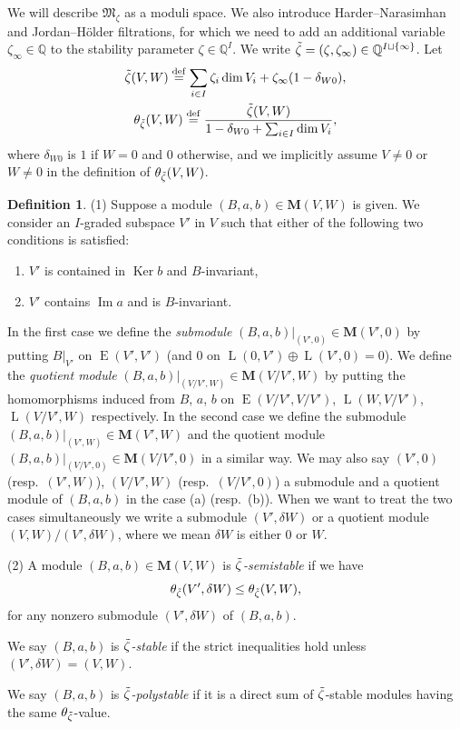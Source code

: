 \documentclass[11pt]{article}
\newenvironment{aenume}{%
  \begin{enumerate}%
  \renewcommand{\theenumi}{\alph{enumi}}%
  \renewcommand{\labelenumi}{\textup{(\theenumi)}}%
  }{\end{enumerate}}
\theoremstyle{definition}
\newtheorem{Definition}[equation]{Definition}
\numberwithin{equation}{section}
\newcommand{\defeq}{\overset{\operatorname{\scriptstyle def}}{=}}
\newcommand{\Q}{{\mathbb Q}}
\newcommand{\Ker}{\operatorname{Ker}}
\newcommand{\Ima}{\operatorname{Im}}
\newcommand{\bM}{{\mathbf M}} %
\newcommand{\M}{{\mathfrak M}} %
\newcommand{\HomE}{\operatorname{E}}
\newcommand{\HomL}{\operatorname{L}}
\begin{document}
We will describe $\M_\zeta$ as a moduli space. We also introduce
Harder--Narasimhan and Jordan--H\"older f\/iltrations, for which we need
to add an additional variable $\zeta_\infty\in\Q$ to the stability
parameter $\zeta\in \Q^I$. We write $\Tilde\zeta =
(\zeta,\zeta_\infty) \in \Q^{I\sqcup\{\infty\}}$. Let
\begin{gather*}
 \Tilde\zeta(V,W)
   \defeq \sum_{i\in I} \zeta_{i} \dim V_i
   + \zeta_\infty (1-\delta_{W0}),
\\
 \theta_{\Tilde\zeta}(V,W)
   \defeq
   \frac{\Tilde\zeta(V,W)}{1 - \delta_{W0} + \sum_{i\in I} \dim V_i},
\end{gather*}
where $\delta_{W0}$ is $1$ if $W=0$ and $0$ otherwise, and we
implicitly assume $V\neq 0$ or $W\neq 0$ in the def\/inition of
$\theta_{\Tilde\zeta}(V,W)$.

\begin{Definition}\label{def:stable}
  \textup{(1)} Suppose a module $(B, a, b)\in\bM(V,W)$ is given. We
  consider an $I$-graded subspace $V'$ in $V$ such that either of the
  following two conditions is satisf\/ied:
\begin{aenume}\itemsep=0pt
\item $V'$ is contained in $\Ker b$ and $B$-invariant,
\item $V'$ contains $\Ima a$ and is $B$-invariant.
\end{aenume}
In the f\/irst case we def\/ine the {\it submodule\/} $(B,a,b)|_{(V',0)} \in
\bM(V',0)$ by putting $B|_{V'}$ on $\HomE(V',V')$ (and $0$ on
$\HomL(0,V')\oplus \HomL(V',0) = 0$). We def\/ine the {\it quotient
  module\/} $(B,a,b)|_{(V/V',W)}\!\in\! \bM(V/V',W)\!$ by putting
the homomorphisms induced from $B$, $a$, $b$ on
$\HomE(V/V',V/V')$, $\HomL(W,V/V')$, $\HomL(V/V',W)$ respectively.
%
In the second case we def\/ine the submodule
$(B,a,b)|_{(V',W)}\in \bM(V',W)$ and the quotient module
$(B,a,b)|_{(V/V',0)}\in \bM(V/V',0)$ in a similar way.
%
We may also say $(V',0)$ \textup(resp.\ $(V',W)$\textup), $(V/V',W)$
\textup(resp.\ $(V/V',0)$\textup) a submodule and a quotient module
of $(B,a,b)$ in the case (a) \textup(resp.\ (b)\textup).
%
When we want to treat the two cases simultaneously we write
a submodule $(V',\delta W)$ or a quotient module $(V, W)/(V',\delta W)$,
where we mean $\delta W$ is either $0$ or $W$.

\textup{(2)} A module $(B, a, b)\in\bM(V,W)$ is {\it
$\Tilde\zeta$-semistable\/} if we have
\begin{equation}\label{eq:slope}
   \theta_{\Tilde\zeta}(V',\delta W) \le \theta_{\Tilde\zeta}(V,W),
\end{equation}
for any nonzero submodule $(V',\delta W)$ of $(B,a,b)$.

We say $(B,a,b)$ is {\it $\Tilde\zeta$-stable\/} if the strict
inequalities hold unless $(V',\delta W) = (V,W)$.


We say $(B,a,b)$ is {\it $\Tilde\zeta$-polystable\/} if it is a
direct sum of $\Tilde\zeta$-stable modules having the same
$\theta_{\Tilde\zeta}$-value.
\end{Definition}
\end{document}
